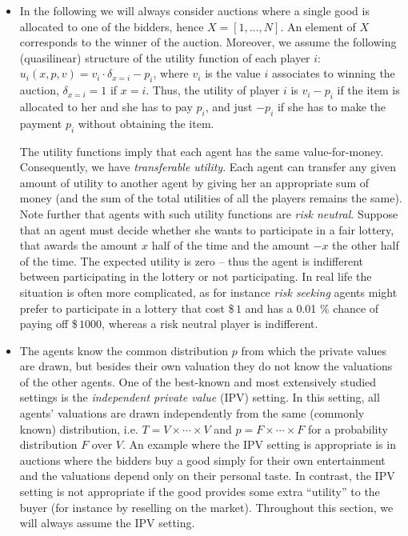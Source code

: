 \begin{itemize}
\item In the following we will always consider auctions where a single good is allocated to one of the bidders, hence $X=[1,\dots ,N]$. An element of $X$ corresponds to the winner of the auction. Moreover, we assume the following (quasilinear) structure of the utility function of each player $i$: $u_i(x,p,v) = v_i \cdot \delta_{x = i} - p_i$, where $v_i$ is the value $i$ associates to winning the auction, $\delta_{x = i} = 1$ if $x = i$. Thus, the utility of player $i$ is $v_i - p_i$ if the item is allocated to her and she has to pay $p_i$, and just $-p_i$ if she has to make the payment $p_i$ without obtaining the item.

The utility functions imply that each agent has the same value-for-money. Consequently, we have \emph{transferable utility}. Each agent can transfer any given amount of utility to another agent by giving her an appropriate sum of money (and the sum of the total utilities of all the players remains the same).
Note further that agents with such utility functions are \emph{risk neutral}. Suppose that an agent must decide whether she wants to participate in a fair lottery, that awards the amount $x$ half of the time and the amount $-x$ the other half of the time. The expected utility is zero -- thus the agent is indifferent between participating in the lottery or not participating. In real life the situation is often more complicated, as for instance \emph{risk seeking} agents might prefer to participate in a lottery that cost \$\,$1$ and has a 0.01 \% chance of paying off \$\,$1000$, whereas a risk neutral player is indifferent.
\item The agents know the common distribution $p$ from which the private values are drawn, but besides their own valuation they do not know the valuations of the other agents. One of the best-known and most extensively studied settings is the \emph{independent private value} (IPV) setting. In this setting, all agents' valuations are drawn independently from the same (commonly known) distribution, i.e. $T = V \times \cdots \times V$ and $p = F \times \cdots \times F$ for a probability distribution $F$ over $V$. An example where the IPV setting is appropriate is in auctions where the bidders buy a good simply for their own entertainment and the valuations depend only on their personal taste. In contrast, the IPV setting is not appropriate if the good provides some extra ``utility'' to the buyer (for instance by reselling on the market).  Throughout this section, we will always assume the IPV setting.
\end{itemize}

